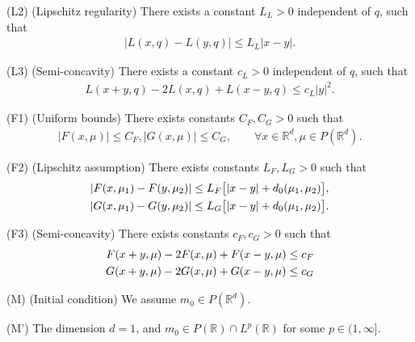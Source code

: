 \documentclass[a4paper,  twoside, 10pt, leqno]{amsart}
\newenvironment{Assumptions}%
{%
\setcounter{enumi}{0}
\renewcommand{\theenumi}{(\textbf{A}\arabic{enumi})}
\renewcommand{\labelenumi}{\theenumi}
\begin{enumerate}}%
{\end{enumerate} }
\newcommand{\R}{\mathbb{R}}
\newcommand{\rd}{\mathbb{R}^d}
\theoremstyle{remark}
\theoremstyle{definition}
\renewcommand{\theenumi}{\textit{\roman{enumi}}}%
\newenvironment{description*}%
  {\begin{description}
    \setlength{\itemsep}{0.33em}
  }
  {\end{description}}
\begin{document}
\begin{description*}
         \item[(L2)\label{L2}](Lipschitz regularity) There exists a constant $L_L >0$ independent of $q$, such that
        \begin{align*}
            |L (x,q) - L (y,q) | \leq L_L |x-y|.
        \end{align*}
    \item[(L3)\label{L3}](Semi-concavity) There exists a constant $c_L >0$ independent of $q$, such that
        \begin{align*}
            L(x+y,q) - 2 L(x,q) + L(x-y,q) \leq c_L |y|^2.
        \end{align*}
     \item[(F1)\label{F1}](Uniform bounds) There exists constants $C_{F}, C_{G} >0$ such that
        \begin{align*}
            |F ( x,\mu ) | \leq C_{F}, |G ( x,\mu ) | \leq C_{G}, \qquad \forall x \in \rd, \mu \in P (\R^d ).
        \end{align*}
    \item[(F2)\label{F2}] (Lipschitz assumption) There exists constants $L_F, L_G >0$ such that
        \begin{align*}
            |F (x,\mu_1 ) - F(y,\mu_2) | \leq L_F \big[ |x-y| + d_0(\mu_1,\mu_2) \big], \\
            \medskip
            |G (x,\mu_1 ) - G(y,\mu_2) | \leq L_G \big[ |x-y| + d_0(\mu_1,\mu_2) \big]. 
        \end{align*}
    \item[(F3)\label{F3}] (Semi-concavity) There exists constants $c_{F}, c_{G} >0$ such that
        \begin{align*}
            F (x+y,\mu ) - 2 F(x,\mu) + F ( x-y,\mu ) \leq c_{F}  \\
            \medskip
            G (x+y,\mu ) - 2 G(x,\mu) + G ( x-y,\mu ) \leq c_{G} 
        \end{align*} 
       \item[(M)\label{M1}](Initial condition) 
   We assume $m_0\in P(\rd)$.    
   \medskip
    \item[(M')\label{M11}] The dimension $d=1$, and $m_0\in P(\R) \cap L^p(\R)$ for some $p\in (1, \infty]$. 
\medskip
\end{description*}
\end{document}
